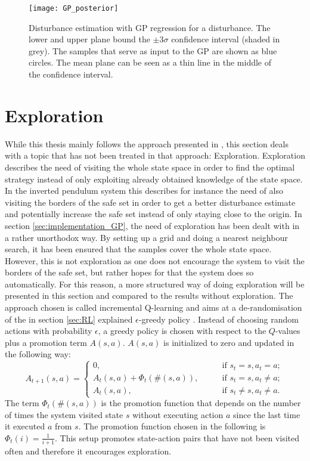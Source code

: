 \documentclass[../main.tex]{subfiles}
\begin{document}
\begin{figure}
    \centering
    \texttt{[image: GP\_posterior]}
        \caption{Disturbance estimation with GP regression for a disturbance. The lower and upper plane bound the $\pm 3\sigma$ confidence interval (shaded in grey). The samples that serve as input to the GP are shown as blue circles. The mean plane can be seen as a thin line in the middle of the confidence interval.}  \label{fig:GP_posterior}
\end{figure}

\section{Exploration}
While this thesis mainly follows the approach presented in \cite{akametalu2014reachability}, this section deals with a topic that has not been treated in that approach: Exploration. Exploration describes the need of visiting the whole state space in order to find the optimal strategy instead of only exploiting already obtained knowledge of the state space. In the inverted pendulum system this describes for instance the need of also visiting the borders of the safe set in order to get a better disturbance estimate and potentially increase the safe set instead of only staying close to the origin. In section \ref{sec:implementation_GP}, the need of exploration has been dealt with in a rather unorthodox way. By setting up a grid and doing a nearest neighbour search, it has been ensured that the samples cover the whole state space. However, this is not exploration as one does not encourage the system to visit the borders of the safe set, but rather hopes for that the system does so automatically. For this reason, a more structured way of doing exploration will be presented in this section and compared to the results without exploration. The approach chosen is called incremental Q-learning and aims at a de-randomisation of the in section \ref{sec:RL} explained $\epsilon$-greedy policy \cite{even2001convergence}. Instead of choosing random actions with probability $\epsilon$, a greedy policy is chosen with respect to the $Q$-values plus a promotion term $A(s,a)$. $A(s,a)$ is initialized to zero and updated in the following way:
\begin{equation}
    A_{t+1}(s,a) = 
\begin{cases}
    0,\qquad &\text{if } s_t = s, a_t = a;\\    
    A_{t}(s,a) + \Phi_t(\#(s,a)),\qquad &\text{if } s_t = s, a_t \neq a;\\
    A_{t}(s,a),\qquad &\text{if } s_t \neq s, a_t \neq a.
\end{cases}
\end{equation}
The term $\Phi_t(\#(s,a))$ is the promotion function that depends on the number of times the system visited state $s$ without executing action $a$ since the last time it executed $a$ from $s$. The promotion function chosen in the following is $\Phi_t(i) = \frac{1}{i+1}$. This setup promotes state-action pairs that have not been visited often and therefore it encourages exploration.
\end{document}
